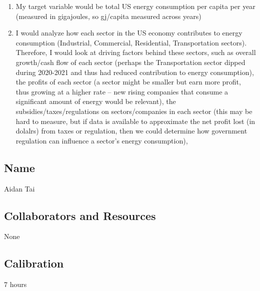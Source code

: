 \documentclass[submit]{harvardml}
\begin{document}
\begin{solution}

  \noindent 
  \begin{enumerate}
    \item My target variable would be total US energy consumption per capita per year
    (measured in gigajoules, so gj/capita measured across years)
    \item I would analyze how each sector in the
    US economy contributes to energy consumption (Industrial, Commercial, Residential, Transportation sectors).
    Therefore, I would look at driving factors behind these sectors, such as
    overall growth/cash flow of each sector (perhaps the Transportation sector dipped during
    2020-2021 and thus had reduced contribution to energy consumption), the profits of
    each sector (a sector might be smaller but earn more profit, thus growing at a higher rate – 
    new rising companies that consume a significant amount of energy would be relevant),
    the subsidies/taxes/regulations on sectors/companies in each sector (this may be hard to measure, but 
    if data is available to approximate the net profit lost (in dolalrs) from taxes 
    or regulation, then we could determine how government regulation can influence
    a sector's energy consumption), 
  \end{enumerate}
\end{solution}

\newpage
\subsection*{Name}
Aidan Tai

\subsection*{Collaborators and Resources}
None

\subsection*{Calibration}
7 hours
\end{document}

